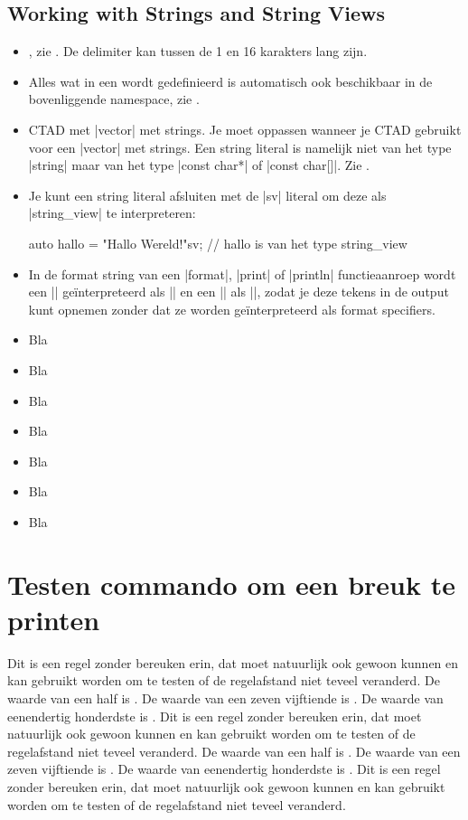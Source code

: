 \begin{cpplstShortInline}
\subsection{Working with Strings and String Views}
\begin{itemize}
	\item
	, zie .
	De delimiter kan tussen de 1 en 16 karakters lang zijn.
	\item
	Alles wat in een  wordt gedefinieerd is automatisch ook beschikbaar in de bovenliggende namespace, zie .
	\item
	CTAD met |vector| met strings.
	Je moet oppassen wanneer je CTAD gebruikt voor een |vector| met strings.
	Een string literal is namelijk niet van het type |string| maar van het type |const char*| of |const char[]|.
	Zie .
	\item
	Je kunt een string literal afsluiten met de |sv| literal om deze als |string_view| te interpreteren:
\begin{cpplstfragment}
	auto hallo = "Hallo Wereld!"sv; // hallo is van het type string_view
\end{cpplstfragment}
	\item
	In de format string van een |format|, |print| of |println| functieaanroep wordt een |{{| geïnterpreteerd als |{| en een |}}| als |}|, zodat je deze tekens in de output kunt opnemen zonder dat ze worden geïnterpreteerd als format specifiers.
	\item
	Bla
	\item
	Bla
	\item
	Bla
	\item
	Bla
	\item
	Bla
	\item
	Bla
	\item
	Bla
\end{itemize}

\section{Testen commando om een breuk te printen}
Dit is een regel zonder bereuken erin, dat moet natuurlijk ook gewoon kunnen en kan gebruikt worden om te testen of de regelafstand niet teveel veranderd.
De waarde van een half is .
De waarde van een zeven vijftiende is .
De waarde van eenendertig honderdste is .
Dit is een regel zonder bereuken erin, dat moet natuurlijk ook gewoon kunnen en kan gebruikt worden om te testen of de regelafstand niet teveel veranderd.
De waarde van een half is .
De waarde van een zeven vijftiende is .
De waarde van eenendertig honderdste is .
Dit is een regel zonder bereuken erin, dat moet natuurlijk ook gewoon kunnen en kan gebruikt worden om te testen of de regelafstand niet teveel veranderd.

\end{cpplstShortInline}
